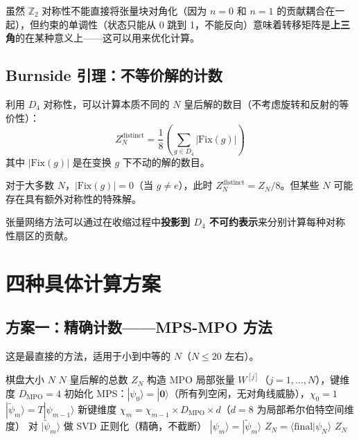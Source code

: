 \documentclass[12pt,a4paper]{ctexart}
\begin{document}
虽然 $\mathbb{Z}_2$ 对称性不能直接将张量块对角化（因为 $n = 0$ 和 $n = 1$ 的贡献耦合在一起），但约束的单调性（状态只能从 0 跳到 1，不能反向）意味着转移矩阵是\textbf{上三角}的在某种意义上——这可以用来优化计算。

\subsection{Burnside 引理：不等价解的计数}

利用 $D_4$ 对称性，可以计算本质不同的 $N$ 皇后解的数目（不考虑旋转和反射的等价性）：
\begin{equation}
Z_N^{\text{distinct}} = \frac{1}{8}\left(\sum_{g \in D_4} |\text{Fix}(g)|\right)
\end{equation}
其中 $|\text{Fix}(g)|$ 是在变换 $g$ 下不动的解的数目。

对于大多数 $N$，$|\text{Fix}(g)| = 0$（当 $g \neq e$），此时 $Z_N^{\text{distinct}} = Z_N / 8$。但某些 $N$ 可能存在具有额外对称性的特殊解。

张量网络方法可以通过在收缩过程中\textbf{投影到 $D_4$ 不可约表示}来分别计算每种对称性扇区的贡献。


\section{四种具体计算方案}

\subsection{方案一：精确计数——MPS-MPO 方法}

这是最直接的方法，适用于小到中等的 $N$（$N \leq 20$ 左右）。

\begin{algorithm}[H]
\caption{精确 MPS-MPO 计算 $Z_N$}
\begin{algorithmic}[1]
\REQUIRE 棋盘大小 $N$
\ENSURE $N$ 皇后解的总数 $Z_N$
\STATE 构造 MPO 局部张量 $W^{[j]}$（$j = 1, \ldots, N$），键维度 $D_{\text{MPO}} = 4$
\STATE 初始化 MPS：$|\psi_0\rangle = |\mathbf{0}\rangle$（所有列空闲，无对角线威胁），$\chi_0 = 1$
    \STATE $|\widetilde{\psi}_m\rangle = T |\psi_{m-1}\rangle$ 
    \STATE 新键维度 $\chi_m = \chi_{m-1} \times D_{\text{MPO}} \times d$（$d = 8$ 为局部希尔伯特空间维度）
    \STATE 对 $|\widetilde{\psi}_m\rangle$ 做 SVD 正则化（精确，不截断）
    \STATE $|\psi_m\rangle = |\widetilde{\psi}_m\rangle$
\ENDFOR
\STATE $Z_N = \langle \text{final} | \psi_N \rangle$
\RETURN $Z_N$
\end{algorithmic}
\end{algorithm}
\end{document}
